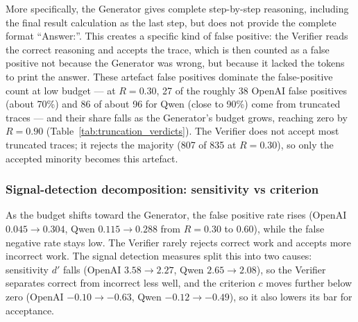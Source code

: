 \documentclass[12pt, a4paper, oneside]{report}
\begin{document}
More specifically, the Generator gives complete step-by-step reasoning, including the
final result calculation as the last step, but does not provide the complete format
``Answer:''. This creates a specific kind of false positive: the Verifier reads the
correct reasoning and accepts the trace, which is then counted as a false positive not
because the Generator was wrong, but because it lacked the tokens to print the answer.
These artefact false positives dominate the false-positive count at low budget --- at
$R=0.30$, 27 of the roughly 38 OpenAI false positives (about 70\%) and 86 of about 96 for
Qwen (close to 90\%) come from truncated traces --- and their share falls as the
Generator's budget grows, reaching zero by $R=0.90$ (Table~\ref{tab:truncation_verdicts}). The Verifier does not
accept most truncated traces; it rejects the majority (807 of 835 at $R=0.30$), so only
the accepted minority becomes this artefact.

\begin{table}[H]
\centering

\caption{Performance metrics by model and ratio. FNR, FPR, mismatch rate, and EDR per ratio per model from \S\ref{sec:metrics}.}
\label{tab:performance_metrics}
\end{table}


\begin{table}[H]
\centering

\caption{Truncation verdicts by model and ratio. Raw counts of generator-truncated traces per ratio per model, with the verifier's ruling on each stub.}
\label{tab:truncation_verdicts}
\end{table}


\subsubsection{Signal-detection decomposition: sensitivity vs criterion}
As the budget shifts toward the Generator, the false positive rate rises (OpenAI $0.045 \rightarrow 0.304$,
 Qwen $0.115 \rightarrow 0.288$ from $R = 0.30$ to $0.60$), while the false negative rate stays low. 
 The Verifier rarely rejects correct work and accepts more incorrect work. The signal detection measures split
  this into two causes: sensitivity $d'$ falls (OpenAI $3.58 \rightarrow 2.27$, Qwen $2.65 \rightarrow 2.08$),
   so the Verifier separates correct from incorrect less well, and the criterion $c$ moves further below zero
    (OpenAI $-0.10 \rightarrow -0.63$, Qwen $-0.12 \rightarrow -0.49$), so it also lowers its bar for acceptance.
\end{document}
